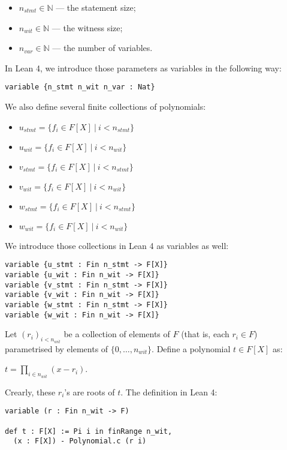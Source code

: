 \documentclass{article}
\theoremstyle{definition}
\theoremstyle{remark}
\begin{document}
\begin{itemize}
\item $n_{stmt} \in \mathbb{N}$ --- the statement size;
\item $n_{wit} \in \mathbb{N}$ --- the witness size;
\item $n_{var} \in \mathbb{N}$ --- the number of variables.
\end{itemize}

In Lean 4, we introduce those parameters as variables in the following way:

\begin{lstlisting}
variable {n_stmt n_wit n_var : Nat}
\end{lstlisting}

We also define several finite collections of polynomials:

\begin{itemize}
\item $u_{stmt} = \{ f_{i} \in F[X] \: | \: i < n_{stmt} \}$
\item $u_{wit} = \{ f_{i} \in F[X] \: | \: i < n_{wit} \}$
\item $v_{stmt} = \{ f_{i} \in F[X] \: | \: i < n_{stmt} \}$
\item $v_{wit} = \{ f_{i} \in F[X] \: | \: i < n_{wit} \}$
\item $w_{stmt} = \{ f_{i} \in F[X] \: | \: i < n_{stmt} \}$
\item $w_{wit} = \{ f_{i} \in F[X] \: | \: i < n_{wit} \}$
\end{itemize}

We introduce those collections in Lean 4 as variables as well:

\begin{lstlisting}
variable {u_stmt : Fin n_stmt -> F[X]}
variable {u_wit : Fin n_wit -> F[X]}
variable {v_stmt : Fin n_stmt -> F[X]}
variable {v_wit : Fin n_wit -> F[X]}
variable {w_stmt : Fin n_stmt -> F[X]}
variable {w_wit : Fin n_wit -> F[X]}
\end{lstlisting}

Let $(r_i)_{i < n_{wit}}$ be a collection of elements of $F$ (that is, each $r_i \in F$) parametrised by elements of $\{0, \dots, n_{wit} \}$. Define a polynomial $t \in F[X]$ as:
\begin{center}
$t = \prod \limits_{i \in n_{wit}} (x - r_i)$.
\end{center}

Crearly, these $r_i$'s are roots of $t$. The definition in Lean 4:
\begin{lstlisting}
variable (r : Fin n_wit -> F)

def t : F[X] := Pi i in finRange n_wit,
  (x : F[X]) - Polynomial.c (r i)
\end{lstlisting}
\end{document}
